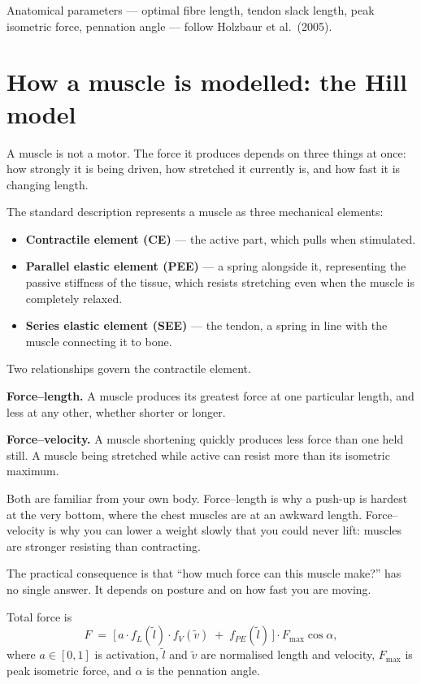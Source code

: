 Anatomical parameters --- optimal fibre length, tendon slack length, peak
isometric force, pennation angle --- follow Holzbaur et al.\ (2005).

\section{How a muscle is modelled: the Hill model}

A muscle is not a motor. The force it produces depends on three things at once:
how strongly it is being driven, how stretched it currently is, and how fast it
is changing length.

The standard description represents a muscle as three mechanical elements:

\begin{itemize}[leftmargin=1.4em, itemsep=3pt]
\item \textbf{Contractile element (CE)} --- the active part, which pulls when
stimulated.
\item \textbf{Parallel elastic element (PEE)} --- a spring alongside it,
representing the passive stiffness of the tissue, which resists stretching even
when the muscle is completely relaxed.
\item \textbf{Series elastic element (SEE)} --- the tendon, a spring in line with
the muscle connecting it to bone.
\end{itemize}

Two relationships govern the contractile element.

\textbf{Force--length.} A muscle produces its greatest force at one particular
length, and less at any other, whether shorter or longer.

\textbf{Force--velocity.} A muscle shortening quickly produces less force than
one held still. A muscle being stretched while active can resist more than its
isometric maximum.

\begin{plain}
Both are familiar from your own body. Force--length is why a push-up is hardest
at the very bottom, where the chest muscles are at an awkward length.
Force--velocity is why you can lower a weight slowly that you could never lift:
muscles are stronger resisting than contracting.

The practical consequence is that ``how much force can this muscle make?'' has no
single answer. It depends on posture and on how fast you are moving.
\end{plain}

Total force is
\[
F \;=\; \big[\, a\cdot f_L(\tilde{l}) \cdot f_V(\tilde{v}) \;+\; f_{PE}(\tilde{l}) \,\big]\cdot F_{\max}\cos\alpha,
\]
where $a\in[0,1]$ is activation, $\tilde{l}$ and $\tilde{v}$ are normalised
length and velocity, $F_{\max}$ is peak isometric force, and $\alpha$ is the
pennation angle.

